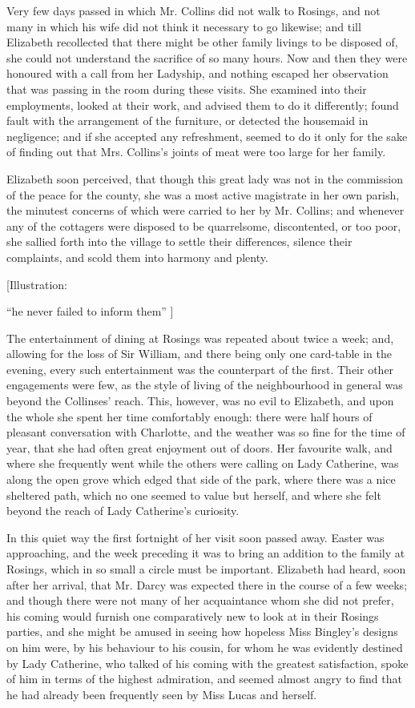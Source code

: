 \documentclass[12pt]{book}
\begin{document}
Very few days passed in which Mr. Collins did not walk to Rosings, and not many in which his wife did not think it necessary to go likewise; and till Elizabeth recollected that there might be other family livings to be disposed of, she could not understand the sacrifice of so many hours. Now and then they were honoured with a call from her Ladyship, and nothing escaped her observation that was passing in the room during these visits. She examined into their employments, looked at their work, and advised them to do it differently; found fault with the arrangement of the furniture, or detected the housemaid in negligence; and if she accepted any refreshment, seemed to do it only for the sake of finding out that Mrs. Collins's joints of meat were too large for her family.

Elizabeth soon perceived, that though this great lady was not in the commission of the peace for the county, she was a most active magistrate in her own parish, the minutest concerns of which were carried to her by Mr. Collins; and whenever any of the cottagers were disposed to be quarrelsome, discontented, or too poor, she sallied forth into the village to settle their differences, silence their complaints, and scold them into harmony and plenty.

[Illustration:

``he never failed to inform them'' ]

The entertainment of dining at Rosings was repeated about twice a week; and, allowing for the loss of Sir William, and there being only one card-table in the evening, every such entertainment was the counterpart of the first. Their other engagements were few, as the style of living of the neighbourhood in general was beyond the Collinses' reach. This, however, was no evil to Elizabeth, and upon the whole she spent her time comfortably enough: there were half hours of pleasant conversation with Charlotte, and the weather was so fine for the time of year, that she had often great enjoyment out of doors. Her favourite walk, and where she frequently went while the others were calling on Lady Catherine, was along the open grove which edged that side of the park, where there was a nice sheltered path, which no one seemed to value but herself, and where she felt beyond the reach of Lady Catherine's curiosity.

In this quiet way the first fortnight of her visit soon passed away. Easter was approaching, and the week preceding it was to bring an addition to the family at Rosings, which in so small a circle must be important. Elizabeth had heard, soon after her arrival, that Mr. Darcy was expected there in the course of a few weeks; and though there were not many of her acquaintance whom she did not prefer, his coming would furnish one comparatively new to look at in their Rosings parties, and she might be amused in seeing how hopeless Miss Bingley's designs on him were, by his behaviour to his cousin, for whom he was evidently destined by Lady Catherine, who talked of his coming with the greatest satisfaction, spoke of him in terms of the highest admiration, and seemed almost angry to find that he had already been frequently seen by Miss Lucas and herself.
\end{document}

